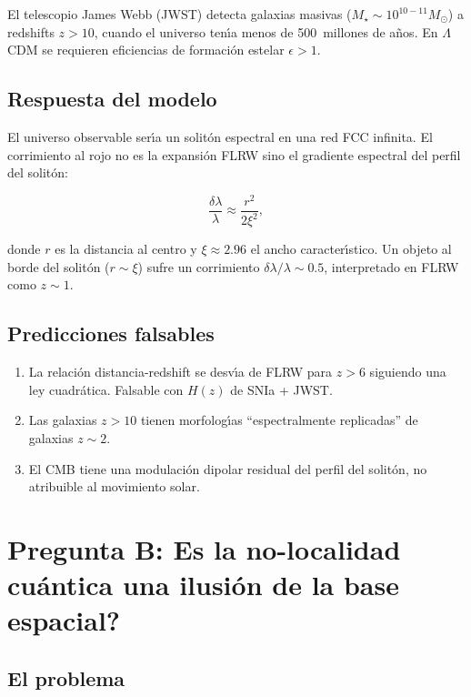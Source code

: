 \documentclass[twocolumn]{article}
\begin{document}
El telescopio James Webb (JWST) detecta galaxias masivas
($M_\star \sim 10^{10-11}M_\odot$) a redshifts $z>10$, cuando el
universo ten\'{\i}a menos de 500~millones de a\~nos. En
$\Lambda$CDM se requieren eficiencias de formaci\'on estelar
$\epsilon > 1$.

\subsection{Respuesta del modelo}

El universo observable ser\'{\i}a un solit\'on espectral en una red
FCC infinita. El corrimiento al rojo no es la expansi\'on FLRW sino
el gradiente espectral del perfil del solit\'on:

\begin{equation}
  \frac{\delta\lambda}{\lambda} \approx \frac{r^2}{2\xi^2},
\end{equation}

donde $r$ es la distancia al centro y $\xi \approx 2.96$ el ancho
caracter\'{\i}stico. Un objeto al borde del solit\'on ($r\sim\xi$)
sufre un corrimiento $\delta\lambda/\lambda\sim0.5$, interpretado
en FLRW como $z\sim1$.

\subsection{Predicciones falsables}

\begin{enumerate}
  \item[A1.] La relaci\'on distancia-redshift se desv\'{\i}a de FLRW
    para $z>6$ siguiendo una ley cuadr\'atica. Falsable con $H(z)$
    de SNIa + JWST.
  \item[A2.] Las galaxias $z>10$ tienen morfolog\'{\i}as
    ``espectralmente replicadas'' de galaxias $z\sim2$.
  \item[A3.] El CMB tiene una modulaci\'on dipolar residual del
    perfil del solit\'on, no atribuible al movimiento solar.
\end{enumerate}

\section{Pregunta B: \textquestiondown Es la no-localidad cu\'antica
  una ilusi\'on de la base espacial?}

\subsection{El problema}
\end{document}
